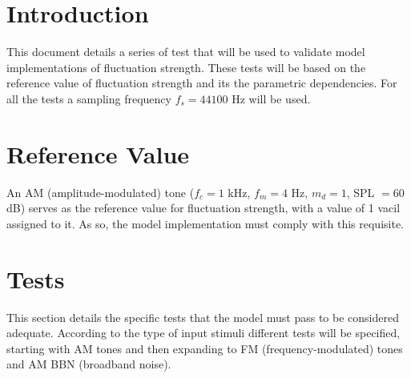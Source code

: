 \documentclass[a4paper]{article}
\begin{document}

\section{Introduction}

This document details a series of test that will be used to validate model
implementations of fluctuation strength. These tests will be based on the
reference value of fluctuation strength and its the parametric dependencies. For
all the tests a sampling frequency $f_s = 44100 $ Hz will be used.

\section{Reference Value}

An AM (amplitude-modulated) tone ($f_c = 1$ kHz, $f_m = 4$ Hz, $m_d = 1$,
SPL $=60$ dB) serves as the reference value for fluctuation strength, with a
value of 1 vacil assigned to it. As so, the model implementation must comply
with this requisite.

\section{Tests}

This section details the specific tests that the model must pass to be
considered adequate. According to the type of input stimuli different tests
will be specified, starting with AM tones and then expanding to FM
(frequency-modulated) tones and AM BBN (broadband noise).



\end{document}
